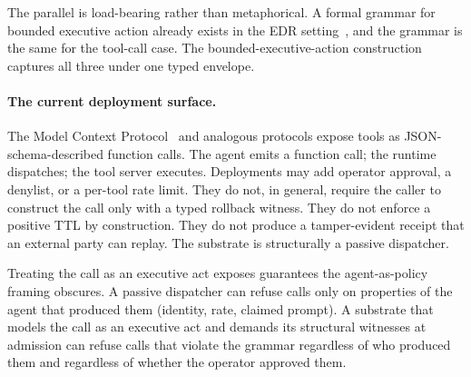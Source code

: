 The parallel is load-bearing rather than metaphorical. A formal grammar for bounded executive action already exists in the EDR setting~\cite{programmableSovereignty2026}, and the grammar is the same for the tool-call case. The bounded-executive-action construction captures all three under one typed envelope.

\paragraph{The current deployment surface.}
The Model Context Protocol~\cite{anthropicMCP2024} and analogous protocols expose tools as JSON-schema-described function calls. The agent emits a function call; the runtime dispatches; the tool server executes. Deployments may add operator approval, a denylist, or a per-tool rate limit. They do not, in general, require the caller to construct the call only with a typed rollback witness. They do not enforce a positive TTL by construction. They do not produce a tamper-evident receipt that an external party can replay. The substrate is structurally a passive dispatcher.

Treating the call as an executive act exposes guarantees the agent-as-policy framing obscures. A passive dispatcher can refuse calls only on properties of the agent that produced them (identity, rate, claimed prompt). A substrate that models the call as an executive act and demands its structural witnesses at admission can refuse calls that violate the grammar regardless of who produced them and regardless of whether the operator approved them.
